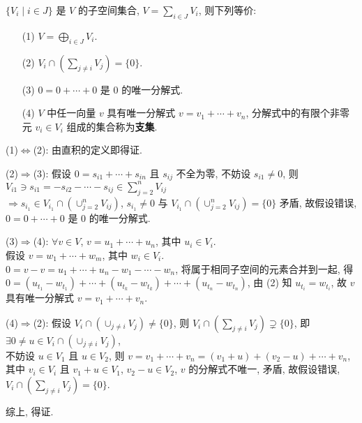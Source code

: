 \documentclass{note}
\begin{document}
\begin{thm}[(课本定理 1.5)]
    $\{V_i\mid i\in J\}$ 是 $V$ 的子空间集合, $V=\sum_{i\in J}V_i$, 则下列等价:
    \begin{itemize}
        \item[(1)] $V=\bigoplus_{i\in J}V_i$.
        \item[(2)] $V_i\cap(\sum_{j\neq i}V_j)=\{0\}$.
        \item[(3)] $0=0+\cdots+0$ 是 $0$ 的唯一分解式.
        \item[(4)] $V$ 中任一向量 $v$ 具有唯一分解式 $v=v_1+\cdots+v_n$, 分解式中的有限个非零元 $v_i\in V_i$ 组成的集合称为\textbf{支集}.
    \end{itemize}
\end{thm}
\begin{pf}
    (1)$\Longleftrightarrow$(2): 由直积的定义即得证.

    (2)$\Longrightarrow$(3): 假设 $0=s_{i1}+\cdots+s_{in}$ 且 $s_{ij}$ 不全为零, 不妨设 $s_{i1}\neq 0$, 则 $V_{i1}\ni s_{i1}=-s_{i2}-\cdots-s_{ij}\in\sum_{j=2}^nV_{ij}$\\
    $\Longrightarrow s_{i_1}\in V_{i_1}\cap(\cup_{j=2}^nV_{ij})$, $s_{i_1}\neq 0$ 与 $V_{i_1}\cap(\cup_{j=2}^nV_{ij})=\{0\}$ 矛盾, 故假设错误, $0=0+\cdots+0$ 是 $0$ 的唯一分解式.

    (3)$\Longrightarrow$(4): $\forall v\in V$, $v=u_1+\cdots+u_n$, 其中 $u_i\in V_i$.\\
    假设 $v=w_1+\cdots+w_m$, 其中 $w_i\in V_i$.\\
    $0=v-v=u_1+\cdots+u_n-w_1-\cdots-w_n$, 将属于相同子空间的元素合并到一起, 得 $0=(u_{t_1}-w_{t_1})+\cdots+(u_{t_k}-w_{t_k})+\cdots+(u_{t_n}-w_{t_n})$, 由 (2) 知 $u_{t_i}=w_{t_i}$, 故 $v$ 具有唯一分解式 $v=v_1+\cdots+v_n$.

    (4)$\Longrightarrow$(2): 假设 $V_i\cap(\cup_{j\neq i}V_j)\neq\{0\}$, 则 $V_i\cap(\sum_{j\neq i}V_j)\supsetneq\{0\}$, 即 $\exists 0\neq u\in V_i\cap(\cup_{j\neq i}V_j)$,\\
    不妨设 $u\in V_1$ 且 $u\in V_2$, 则 $v=v_1+\cdots+v_n=(v_1+u)+(v_2-u)+\cdots+v_n$, 其中 $v_i\in V_i$ 且 $v_1+u\in V_1$, $v_2-u\in V_2$, $v$ 的分解式不唯一, 矛盾, 故假设错误, $V_i\cap(\sum_{j\neq i}V_j)=\{0\}$.

    综上, 得证.
\end{pf}
\end{document}

